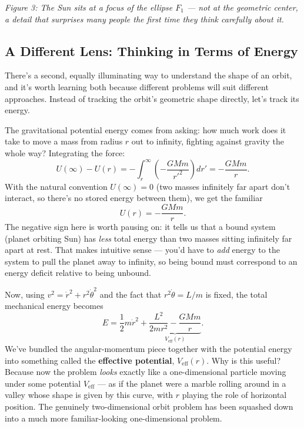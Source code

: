 \documentclass[11pt]{article}
\begin{document}
\begin{center}
\end{center}
\begin{center}\textit{Figure 3: The Sun sits at a focus of the ellipse $F_1$ --- not at the geometric
center, a detail that surprises many people the first time they think carefully about it.}\end{center}

\subsection{A Different Lens: Thinking in Terms of Energy}

There's a second, equally illuminating way to understand the shape of an orbit, and it's worth
learning both because different problems will suit different approaches. Instead of tracking the
orbit's geometric shape directly, let's track its energy.

The gravitational potential energy comes from asking: how much work does it take to move a mass
from radius $r$ out to infinity, fighting against gravity the whole way? Integrating the force:
\[
U(\infty)-U(r) = -\int_r^\infty\left(-\frac{GMm}{r'^2}\right)dr' = -\frac{GMm}{r}.
\]
With the natural convention $U(\infty)=0$ (two masses infinitely far apart don't interact, so
there's no stored energy between them), we get the familiar
\[
\boxed{U(r) = -\frac{GMm}{r}.}
\]
The negative sign here is worth pausing on: it tells us that a bound system (planet orbiting
Sun) has \emph{less} total energy than two masses sitting infinitely far apart at rest. That makes
intuitive sense --- you'd have to \emph{add} energy to the system to pull the planet away to
infinity, so being bound must correspond to an energy deficit relative to being unbound.

Now, using $v^2=\dot r^2+r^2\dot\theta^2$ and the fact that $r^2\dot\theta=L/m$ is fixed, the total
mechanical energy becomes
\[
E = \frac12m\dot r^2 + \underbrace{\frac{L^2}{2mr^2} - \frac{GMm}{r}}_{\displaystyle V_{\text{eff}}(r)}.
\]
We've bundled the angular-momentum piece together with the potential energy into something called
the \textbf{effective potential}, $V_{\text{eff}}(r)$. Why is this useful? Because now the problem
\emph{looks} exactly like a one-dimensional particle moving under some potential $V_{\text{eff}}$
--- as if the planet were a marble rolling around in a valley whose shape is given by this curve,
with $r$ playing the role of horizontal position. The genuinely two-dimensional orbit problem has
been squashed down into a much more familiar-looking one-dimensional problem.
\end{document}
